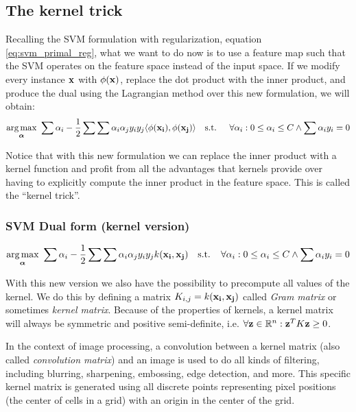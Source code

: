 \subsection{The kernel trick}

Recalling the SVM formulation with regularization, equation \ref{eq:svm_primal_reg}, what we want to do now is to use a feature map such that the SVM operates on the feature space instead of the input space. If we modify every instance $\mathbf{x}$ with $\phi(\mathbf{x})$, replace the dot product with the inner product, and produce the dual using the Lagrangian method over this new formulation, we will obtain:
\begin{align*}
    \underset{\boldsymbol{\alpha}}{\text{arg} \max}\ \sum \alpha_i - \frac{1}{2} \sum \sum \alpha_i \alpha_j y_i y_j \langle\phi(\mathbf{x_i}), \phi(\mathbf{x_j})\rangle
    \text{\quad s.t. \quad} \forall \alpha_i : 0 \le \alpha_i \le C \land \sum \alpha_i y_i = 0
\end{align*}

Notice that with this new formulation we can replace the inner product with a kernel function and profit from all the advantages that kernels provide over having to explicitly compute the inner product in the feature space. This is called the “kernel trick”.

\subsubsection*{SVM Dual form (kernel version)}
\begin{align}\label{eq:svm_dual_kernel} 
    \underset{\boldsymbol{\alpha}}{\text{arg} \max}\ \sum \alpha_i - \frac{1}{2} \sum \sum \alpha_i \alpha_j y_i y_j k(\mathbf{x_i}, \mathbf{x_j})
    \text{\ \ \ s.t. \ \ } \forall \alpha_i : 0 \le \alpha_i \le C \land \sum \alpha_i y_i = 0
\end{align}

With this new version we also have the possibility to precompute all values of the kernel. We do this by defining a matrix $K_{i,j} = k(\mathbf{x_i}, \mathbf{x_j})$ called \emph{Gram matrix} or sometimes \emph{kernel matrix}. Because of the properties of kernels, a kernel matrix will always be symmetric and positive semi-definite, i.e. $\forall \mathbf{z} \in \mathbb{R}^n : \mathbf{z}^T K \mathbf{z} \ge 0$.

In the context of image processing, a convolution between a kernel matrix (also called \emph{convolution matrix}) and an image is used to do all kinds of filtering, including blurring, sharpening, embossing, edge detection, and more. This specific kernel matrix is generated using all discrete points representing pixel positions (the center of cells in a grid) with an origin in the center of the grid.

